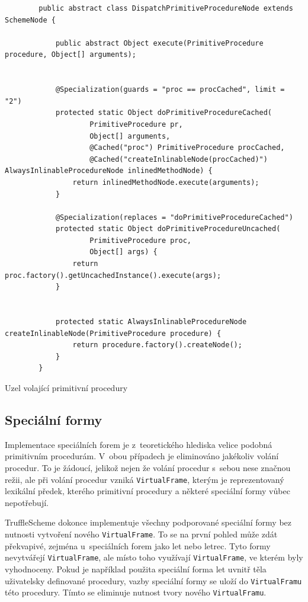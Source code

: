 \documentclass[
  master,
  biblatex,
  figures=true,
  theorems,
  sourcecodes,
  glossaries,
  index
]{kidiplom}
\begin{document}
\begin{listing} [H]
    \begin{verbatim}
        public abstract class DispatchPrimitiveProcedureNode extends SchemeNode {
        
            public abstract Object execute(PrimitiveProcedure procedure, Object[] arguments);
        
        
            @Specialization(guards = "proc == procCached", limit = "2")
            protected static Object doPrimitiveProcedureCached(
                    PrimitiveProcedure pr,
                    Object[] arguments,
                    @Cached("proc") PrimitiveProcedure procCached,
                    @Cached("createInlinableNode(procCached)") AlwaysInlinableProcedureNode inlinedMethodNode) {
                return inlinedMethodNode.execute(arguments);
            }
        
            @Specialization(replaces = "doPrimitiveProcedureCached")
            protected static Object doPrimitiveProcedureUncached(
                    PrimitiveProcedure proc,
                    Object[] args) {
                return proc.factory().getUncachedInstance().execute(args);
            }
        
        
            protected static AlwaysInlinableProcedureNode createInlinableNode(PrimitiveProcedure procedure) {
                return procedure.factory().createNode();
            }
        }
    \end{verbatim}
    \caption{Uzel volající primitivní procedury}
    \label{DispatchPrimitiveProcedureNode}
\end{listing}


\subsection{Speciální formy}
Implementace speciálních forem je z~teoretického hlediska velice podobná primitivním procedurám. V~obou případech je eliminováno jakékoliv volání procedur. To je žádoucí, jelikož nejen že volání procedur s~sebou nese značnou režii, ale při volání procedur vzniká \texttt{VirtualFrame}, kterým je reprezentovaný lexikální předek, kterého primitivní procedury a některé speciální formy vůbec nepotřebují. 

TruffleScheme dokonce implementuje všechny podporované speciální formy bez nutnosti vytvoření nového \texttt{VirtualFrame}. To se na první pohled může zdát překvapivé, zejména u~speciálních forem jako let nebo letrec. Tyto formy nevytvářejí \texttt{VirtualFrame}, ale místo toho využívají \texttt{VirtualFrame}, ve kterém byly vyhodnoceny. Pokud je například použita speciální forma let uvnitř těla uživatelsky definované procedury, vazby speciální formy se uloží do \texttt{VirtualFramu} této procedury. Tímto se eliminuje nutnost tvory nového \texttt{VirtualFramu}.
\end{document}
